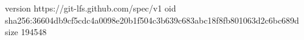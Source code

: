 version https://git-lfs.github.com/spec/v1
oid sha256:36604db9cf5cdc4a0098e20b1f504c3b639c683abc18f8fb801063d2c6bc689d
size 194548
